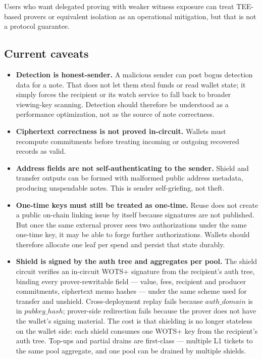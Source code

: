 \documentclass[11pt]{article}
\begin{document}
Users who want delegated proving with weaker witness exposure can treat TEE-based
provers or equivalent isolation as an operational mitigation, but that is not a
protocol guarantee.

\subsection{Current caveats}

\begin{itemize}
  \item \textbf{Detection is honest-sender.} A malicious sender can post bogus
        detection data for a note. That does not let them steal funds or read
        wallet state; it simply forces the recipient or its watch service to
        fall back to broader viewing-key scanning. Detection should therefore
        be understood as a performance optimization, not as the source of note
        correctness.
  \item \textbf{Ciphertext correctness is not proved in-circuit.} Wallets must
        recompute commitments before treating incoming or outgoing recovered
        records as valid.
  \item \textbf{Address fields are not self-authenticating to the sender.}
        Shield and transfer outputs can be formed with malformed public address
        metadata, producing unspendable notes. This is sender self-griefing,
        not theft.
  \item \textbf{One-time keys must still be treated as one-time.} Reuse does
        not create a public on-chain linking issue by itself because signatures
        are not published. But once the same external prover sees two
        authorizations under the same one-time key, it may be able to forge
        further authorizations. Wallets should therefore allocate one leaf per
        spend and persist that state durably.
  \item \textbf{Shield is signed by the auth tree and aggregates per
        pool.} The shield circuit verifies an in-circuit WOTS+ signature
        from the recipient's auth tree, binding every prover-rewritable
        field --- value, fees, recipient and producer commitments,
        ciphertext memo hashes --- under the same scheme used for
        transfer and unshield. Cross-deployment replay fails because
        \(auth\_domain\) is in \(pubkey\_hash\); prover-side redirection
        fails because the prover does not have the wallet's signing
        material. The cost is that shielding is no longer stateless on
        the wallet side: each shield consumes one WOTS+ key from the
        recipient's auth tree. Top-ups and partial drains are first-class
        — multiple L1 tickets to the same pool aggregate, and one pool
        can be drained by multiple shields.
\end{itemize}
\end{document}
